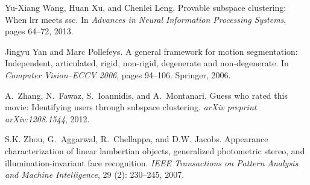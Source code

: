 \documentclass{ctexart}
\begin{document}
\begin{thebibliography}{47}
    Yu-Xiang Wang, Huan Xu, and Chenlei Leng.
    \newblock Provable subspace clustering: When lrr meets ssc.
    \newblock In \emph{Advances in Neural Information Processing Systems}, pages
    64--72, 2013.

    Jingyu Yan and Marc Pollefeys.
    \newblock A general framework for motion segmentation: Independent,
    articulated, rigid, non-rigid, degenerate and non-degenerate.
    \newblock In \emph{Computer Vision--ECCV 2006}, pages 94--106. Springer, 2006.

    A.~Zhang, N.~Fawaz, S.~Ioannidis, and A.~Montanari.
    \newblock Guess who rated this movie: Identifying users through subspace
    clustering.
    \newblock \emph{arXiv preprint arXiv:1208.1544}, 2012.

    S.K. Zhou, G.~Aggarwal, R.~Chellappa, and D.W. Jacobs.
    \newblock Appearance characterization of linear lambertian objects, generalized
    photometric stereo, and illumination-invariant face recognition.
    \newblock \emph{IEEE Transactions on Pattern Analysis and Machine
    Intelligence}, 29 (2): 230--245, 2007.

\end{thebibliography}
\end{document}
